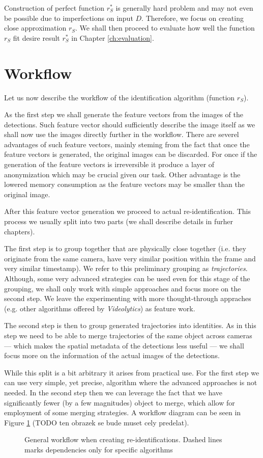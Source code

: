 Construction of perfect function $r_S^*$ is generally hard problem and may not even
be possible due to imperfections on input $D$. Therefore, we focus on creating
close approximation $r_S$. We shall then proceed to evaluate how well the function
$r_S$ fit desire result $r_S^*$ in Chapter \ref{ch:evaluation}.

\section{Workflow}

Let us now describe the workflow of the identification algorithm (function $r_S$).

As the first step we shall generate the feature vectors from the images of the detections. Such
feature vector should sufficiently describe the image itself as we shall now use the images directly
further in the workflow. There are severel advantages of such feature vectors, mainly steming from the
fact that once the feature vectors is generated, the original images can be discarded. For once if the
generation of the feature vectors is irreversible it produce a layer of anonymization which may be
crucial given our task. Other advantage is the lowered memory consumption as the feature vectors may
be smaller than the original image.

After this feature vector generation we proceed to actual re-identification. This process we usually
split into two parts (we shall describe details in furher chapters).

The first step is to group together that are physically close together (i.e. they originate from
the same camera, have very similar position within the frame and very similar timestamp). We refer
to this preliminary grouping as \emph{trajectories}. Although, some very advanced strategies can
be used even for this stage of the grouping, we shall only work with simple approaches and focus
more on the second step. We leave the experimenting with more thought-through appraches (e.g.
other algorithms offered by \emph{Videolytics}) as feature work.

The second step is then to group generated trajectories into identities. As in this step we need
to be able to merge trajectories of the same object across cameras --- which makes the spatial
metadata of the detections less useful --- we shall focus more on the information of the actual
images of the detections.

While this split is a bit arbitrary it arises from practical use. For the first step we can use
very simple, yet precise, algorithm where the advanced approaches is not needed. In the second
step then we can leverage the fact that we have significantly fewer (by a few magnitudes) object
to merge, which allow for employment of some merging strategies. A workflow diagram can be seen
in Figure \ref{fig:workflow} (TODO ten obrazek se bude muset cely predelat).

\begin{figure}
    \centering
    \def\svgwidth{\textwidth}
    
    \caption{General workflow when creating re-identifications. Dashed lines marks
    dependencies only for specific algorithms}
    \label{fig:workflow}
\end{figure}


